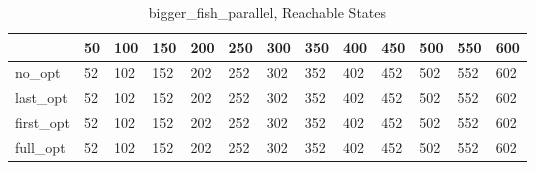\begin{table}
\caption{bigger\_fish\_parallel, Reachable States}
\label{bigger_fish_parallel_reach}
\begin{tabular}{lllllllllllll}
\toprule
 & 50 & 100 & 150 & 200 & 250 & 300 & 350 & 400 & 450 & 500 & 550 & 600 \\
\midrule
no\_opt & 52 & 102 & 152 & 202 & 252 & 302 & 352 & 402 & 452 & 502 & 552 & 602 \\
last\_opt & 52 & 102 & 152 & 202 & 252 & 302 & 352 & 402 & 452 & 502 & 552 & 602 \\
first\_opt & 52 & 102 & 152 & 202 & 252 & 302 & 352 & 402 & 452 & 502 & 552 & 602 \\
full\_opt & 52 & 102 & 152 & 202 & 252 & 302 & 352 & 402 & 452 & 502 & 552 & 602 \\
\bottomrule
\end{tabular}
\end{table}
